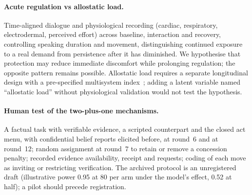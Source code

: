 \documentclass[runningheads]{llncs}
\begin{document}
\paragraph{Acute regulation vs allostatic load.} Time-aligned dialogue and physiological recording (cardiac, respiratory, electrodermal, perceived effort) across baseline, interaction and recovery, controlling speaking duration and movement, distinguishing continued exposure to a real demand from persistence after it has diminished. We hypothesise that protection may reduce immediate discomfort while prolonging regulation; the opposite pattern remains possible. Allostatic load requires a separate longitudinal design with a pre-specified multisystem index~\cite{seeman2001allostatic}; adding a latent variable named ``allostatic load'' without physiological validation would not test the hypothesis.
\paragraph{Human test of the two-plus-one mechanisms.} A factual task with verifiable evidence, a scripted counterpart and the closed act menu, with confidential belief reports elicited before, at round~6 and at round~12; random assignment at round~7 to retain or remove a concession penalty; recorded evidence availability, receipt and requests; coding of each move as inviting or restricting verification. The archived protocol is an unregistered draft (illustrative power 0.95 at 80 per arm under the model's effect, 0.52 at half); a pilot should precede registration.
\end{document}

